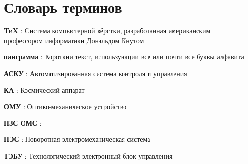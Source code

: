 \chapter*{Словарь терминов}             %

\textbf{TeX} : Cистема компьютерной вёрстки, разработанная американским профессором информатики Дональдом Кнутом

\textbf{панграмма} : Короткий текст, использующий все или почти все буквы алфавита

\textbf{АСКУ} : Автоматизированная система контроля и управления

\textbf {КА} : Космический аппарат

\textbf {ОМУ} : Оптико-механическое  устройство

\textbf {ПЗС ОМС} : 

\textbf {ПЭС} : Поворотная электромеханическая система

\textbf {ТЭБУ} : Технологический электронный блок управления 
